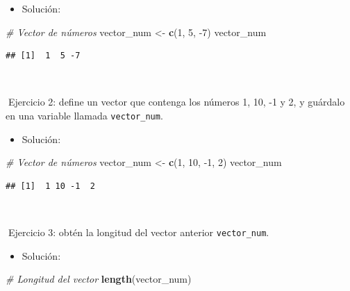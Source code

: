 \documentclass[11pt,]{book}
\newenvironment{Shaded}{\begin{snugshade}}{\end{snugshade}}
\newcommand{\CommentTok}[1]{\textcolor[rgb]{0.37,0.37,0.37}{\textit{#1}}}
\newcommand{\DecValTok}[1]{\textcolor[rgb]{0.06,0.06,0.06}{#1}}
\newcommand{\KeywordTok}[1]{\textcolor[rgb]{0.27,0.27,0.27}{\textbf{#1}}}
\newcommand{\NormalTok}[1]{#1}
\newcommand{\StringTok}[1]{\textcolor[rgb]{0.5,0.5,0.5}{#1}}
\providecommand{\tightlist}{%
  \setlength{\itemsep}{0pt}\setlength{\parskip}{0pt}}
\begin{document}
\begin{itemize}
\tightlist
\item
  Solución:
\end{itemize}

\begin{Shaded}
\begin{Highlighting}[]
\CommentTok{# Vector de números}
\NormalTok{vector_num <-}\StringTok{ }\KeywordTok{c}\NormalTok{(}\DecValTok{1}\NormalTok{, }\DecValTok{5}\NormalTok{, }\DecValTok{-7}\NormalTok{)}
\NormalTok{vector_num}
\end{Highlighting}
\end{Shaded}

\begin{verbatim}
## [1]  1  5 -7
\end{verbatim}

~

📝Ejercicio 2: define un vector que contenga los números 1, 10, -1 y 2, y guárdalo en una variable llamada \texttt{vector\_num}.

\begin{itemize}
\tightlist
\item
  Solución:
\end{itemize}

\begin{Shaded}
\begin{Highlighting}[]
\CommentTok{# Vector de números}
\NormalTok{vector_num <-}\StringTok{ }\KeywordTok{c}\NormalTok{(}\DecValTok{1}\NormalTok{, }\DecValTok{10}\NormalTok{, }\DecValTok{-1}\NormalTok{, }\DecValTok{2}\NormalTok{)}
\NormalTok{vector_num}
\end{Highlighting}
\end{Shaded}

\begin{verbatim}
## [1]  1 10 -1  2
\end{verbatim}

~

📝Ejercicio 3: obtén la longitud del vector anterior \texttt{vector\_num}.

\begin{itemize}
\tightlist
\item
  Solución:
\end{itemize}

\begin{Shaded}
\begin{Highlighting}[]
\CommentTok{# Longitud del vector}
\KeywordTok{length}\NormalTok{(vector_num)}
\end{Highlighting}
\end{Shaded}
\end{document}
